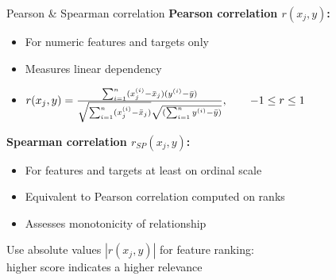 \documentclass[11pt,compress,t,notes=noshow, xcolor=table]{beamer}
\begin{document}
  \begin{frame2}{Pearson \& Spearman correlation}
  \textbf{Pearson correlation $r(x_j, y)$: }
  \begin{itemize}
    \item For numeric features and targets only
    \item Measures linear dependency
    \item $ r(x_j, y) = \frac{\sum_{i=1}^n (x^{(i)}_j - \bar{x}_j) (y^{(i)} - \bar{y})}{\sqrt{\sum_{i=1}^n (x^{(i)}_j - \bar{x}_j)} \sqrt{(\sum_{i=1}^n y^{(i)} - \bar{y})}},\qquad -1 \le r \le 1$
  \end{itemize}
  \vspace{0.4cm}
  \textbf{Spearman correlation $r_{SP}(x_j, y)$:}
  \begin{itemize}
    \item For features and targets at least on ordinal scale
    \item Equivalent to Pearson correlation computed on ranks
    \item Assesses monotonicity of relationship
  \end{itemize}
  \lz
  Use absolute values $|r(x_j, y)|$ for feature ranking:\\
  higher score indicates a higher relevance

  \end{frame2}
\end{document}
